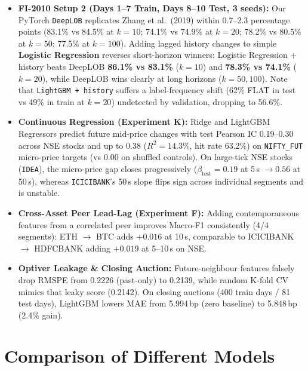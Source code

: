 \documentclass[12pt,a4paper,oneside]{report}
\newcommand{\code}[1]{\texttt{#1}}
\begin{document}
\begin{itemize}
  \item \textbf{FI-2010 Setup 2 (Days 1--7 Train, Days 8--10 Test, 3 seeds):} Our PyTorch \code{DeepLOB} replicates Zhang et al.\ (2019) within 0.7--2.3 percentage points (83.1\% vs 84.5\% at $k=10$; 74.1\% vs 74.9\% at $k=20$; 78.2\% vs 80.5\% at $k=50$; 77.5\% at $k=100$). Adding lagged history changes to simple \textbf{Logistic Regression} reverses short-horizon winners: Logistic Regression + history beats DeepLOB \textbf{86.1\% vs 83.1\%} ($k=10$) and \textbf{78.3\% vs 74.1\%} ($k=20$), while DeepLOB wins clearly at long horizons ($k=50, 100$). Note that \code{LightGBM + history} suffers a label-frequency shift (62\% FLAT in test vs 49\% in train at $k=20$) undetected by validation, dropping to 56.6\%.
  \item \textbf{Continuous Regression (Experiment K):} Ridge and LightGBM Regressors predict future mid-price changes with test Pearson IC 0.19--0.30 across NSE stocks and up to 0.38 ($R^2 = 14.3\%$, hit rate 63.2\%) on \code{NIFTY\_FUT} micro-price targets (vs 0.00 on shuffled controls). On large-tick NSE stocks (\code{IDEA}), the micro-price gap closes progressively ($\beta_{\text{test}} = 0.19$ at 5\,s $\to 0.56$ at 50\,s), whereas \code{ICICIBANK}'s 50\,s slope flips sign across individual segments and is unstable.
  \item \textbf{Cross-Asset Peer Lead-Lag (Experiment F):} Adding contemporaneous features from a correlated peer improves Macro-F1 consistently (4/4 segments): ETH $\to$ BTC adds $+0.016$ at 10\,s, comparable to ICICIBANK $\to$ HDFCBANK adding $+0.019$ at 5--10\,s on NSE.
  \item \textbf{Optiver Leakage \& Closing Auction:} Future-neighbour features falsely drop RMSPE from 0.2226 (past-only) to 0.2139, while random K-fold CV mimics that leaky score (0.2142). On closing auctions (400 train days / 81 test days), LightGBM lowers MAE from 5.994\,bp (zero baseline) to 5.848\,bp (2.4\% gain).
\end{itemize}

\section{Comparison of Different Models}
\end{document}
